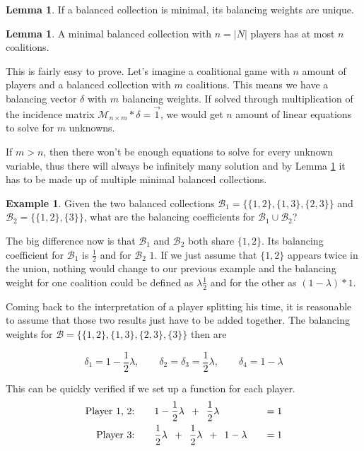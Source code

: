 \documentclass[10pt,a4paper,titlepage]{article}
\theoremstyle{plain}
\theoremstyle{definition}
\newtheorem{example}[thm]{Example} %
\newtheorem{lemma}[thm]{Lemma}
\begin{document}
\begin{lemma}\label{lem:minimalunique}
    If a balanced collection is minimal, its balancing weights are unique.
\end{lemma}

\begin{lemma}\label{lem:atmostncoalitions}
    A minimal balanced collection with $n = |N|$ players has at most $n$ coalitions.
\end{lemma}

This is fairly easy to prove. Let's imagine a coalitional game with $n$ amount of players and a balanced collection with $m$ coalitions. This means we have a balancing vector $\delta$ with $m$ balancing weights. If solved through multiplication of the incidence matrix $\mathcal{M}_{n \times m}*\delta = \vec{1}$, we would get $n$ amount of linear equations to solve for $m$ unknowns.

If $m > n$, then there won't be enough equations to solve for every unknown variable, thus there will always be infinitely many solution and by Lemma \ref{lem:minimalunique} it has to be made up of multiple minimal balanced collections.

\begin{example}\label{ex:twounion}
    Given the two balanced collections $\mathcal{B}_1 = \{\{1, 2\}, \{1, 3\}, \{2, 3\}\}$ and $\mathcal{B}_2 = \{\{1, 2\}, \{3\}\}$, what are the balancing coefficients for $\mathcal{B}_1 \cup \mathcal{B}_2$?

    The big difference now is that $\mathcal{B}_1$ and $\mathcal{B}_2$ both share $\{1, 2\}$. Its balancing coefficient for $\mathcal{B}_1$ is $\frac{1}{2}$ and for $\mathcal{B}_2$ $1$. If we just assume that $\{1, 2\}$ appears twice in the union, nothing would change to our previous example and the balancing weight for one coalition could be defined as $\lambda \frac{1}{2}$ and for the other as $(1 - \lambda) * 1$.

    Coming back to the interpretation of a player splitting his time, it is reasonable to assume that those two results just have to be added together. The balancing weights for $\mathcal{B} = \{\{1, 2\}, \{1, 3\}, \{2, 3\}, \{3\}\}$ then are

    \begin{equation*}
        \delta_1 = 1 - \frac{1}{2}\lambda,\qquad \delta_2 = \delta_3 = \frac{1}{2}\lambda,\qquad \delta_4 = 1 - \lambda
    \end{equation*}

    This can be quickly verified if we set up a function for each player.
    \begin{alignat*}{2}
        \text{Player 1, 2:}\qquad &1 - \frac{1}{2}\lambda\enskip +\enskip \frac{1}{2}\lambda &\quad= 1\\
        \text{Player 3:}\qquad &\frac{1}{2}\lambda\enskip  + \enskip \frac{1}{2}\lambda \enskip + \enskip 1 - \lambda &\quad= 1
    \end{alignat*}
\end{example}
\end{document}
